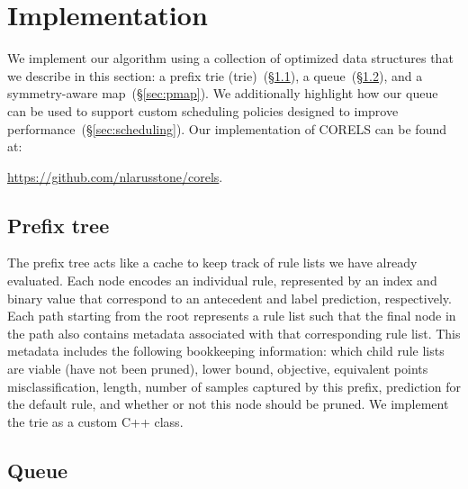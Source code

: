 

\section{Implementation}
\label{sec:implementation}

We implement our algorithm using a collection of optimized data structures
that we describe in this section:
a prefix trie (trie)~(\S\ref{sec:trie}), a queue~(\S\ref{sec:queue}),
and a symmetry-aware map~(\S\ref{sec:pmap}).
%
We additionally highlight how our queue can be used to support
custom scheduling policies designed to improve performance~(\S\ref{sec:scheduling}).
%
Our implementation of CORELS can be found at: \\

\centerline{\url{https://github.com/nlarusstone/corels}.}

\subsection{Prefix tree}
\label{sec:trie}

The prefix tree acts like a cache to keep track of rule lists we have already evaluated.
%
Each node encodes an individual rule, represented by an index and binary value
that correspond to an antecedent and label prediction, respectively.
%
Each path starting from the root represents a rule list such that the final node
in the path also contains metadata associated with that corresponding rule list.
%
This metadata includes the following bookkeeping information:
which child rule lists are viable (\ie  have not been pruned),
lower bound, objective, equivalent points misclassification, length,
number of samples captured by this prefix, prediction for the default rule,
and whether or not this node should be pruned.
%
We implement the trie as a custom C++ class. %
%

\subsection{Queue}
\label{sec:queue}

